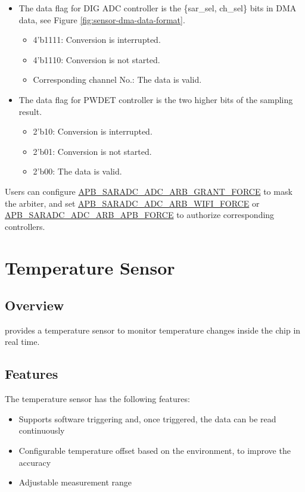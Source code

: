 \documentclass[main\_\_EN.tex]{subfiles}
\begin{document}
\begin{itemize}
    \item The data flag for DIG ADC controller is the \{sar\_sel, ch\_sel\} bits in DMA data, see Figure \ref{fig:sensor-dma-data-format}.
    \begin{itemize}
        \item 4'b1111: Conversion is interrupted.
        \item 4'b1110: Conversion is not started.
        \item Corresponding channel No.: The data is valid.
    \end{itemize}
    \item The data flag for PWDET controller is the two higher bits of the sampling result.
    
    \begin{itemize}
        \item 2'b10: Conversion is interrupted.
        \item 2'b01: Conversion is not started.
        \item 2'b00: The data is valid.
    \end{itemize}
\end{itemize}
Users can configure  \hyperref[fielddesc:APBSARADCADCARBGRANTFORCE]{APB\_SARADC\_ADC\_ARB\_GRANT\_FORCE} to mask the arbiter, and set  \hyperref[fielddesc:APBSARADCADCARBWIFIFORCE]{APB\_SARADC\_ADC\_ARB\_WIFI\_FORCE} or \hyperref[fielddesc:APBSARADCADCARBAPBFORCE]{APB\_SARADC\_ADC\_ARB\_APB\_FORCE} to authorize corresponding controllers.

\section{Temperature Sensor}\label{sec:sensor-temp-sensor}
\subsection{Overview}
\chipname{} provides a temperature sensor to monitor temperature changes inside the chip in real time.

\subsection{Features}
The temperature sensor has the following features:
\begin{itemize}
    \item Supports software triggering and, once triggered, the data can be read continuously
    \item Configurable temperature offset based on the environment, to improve the accuracy
    \item Adjustable measurement range
\end{itemize}
\end{document}
